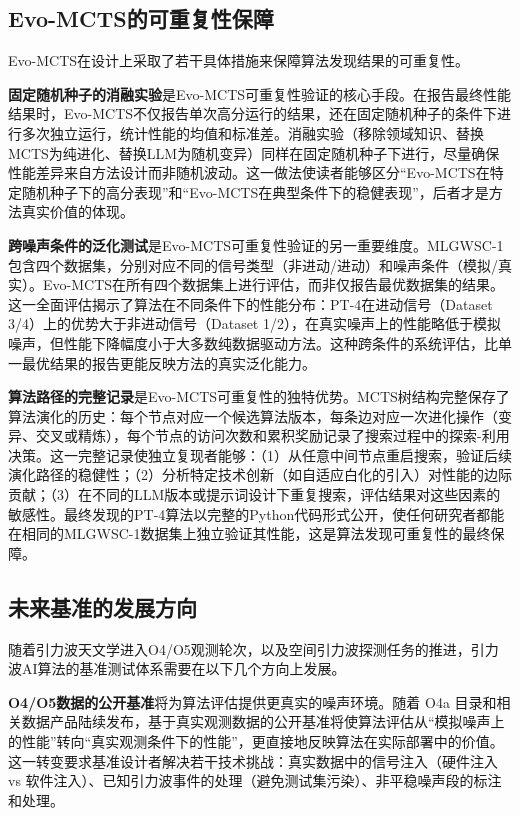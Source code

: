 \subsection*{Evo-MCTS的可重复性保障}

Evo-MCTS在设计上采取了若干具体措施来保障算法发现结果的可重复性。

\textbf{固定随机种子的消融实验}是Evo-MCTS可重复性验证的核心手段。在报告最终性能结果时，Evo-MCTS不仅报告单次高分运行的结果，还在固定随机种子的条件下进行多次独立运行，统计性能的均值和标准差。消融实验（移除领域知识、替换MCTS为纯进化、替换LLM为随机变异）同样在固定随机种子下进行，尽量确保性能差异来自方法设计而非随机波动。这一做法使读者能够区分“Evo-MCTS在特定随机种子下的高分表现”和“Evo-MCTS在典型条件下的稳健表现”，后者才是方法真实价值的体现。

\textbf{跨噪声条件的泛化测试}是Evo-MCTS可重复性验证的另一重要维度。MLGWSC-1包含四个数据集，分别对应不同的信号类型（非进动/进动）和噪声条件（模拟/真实）。Evo-MCTS在所有四个数据集上进行评估，而非仅报告最优数据集的结果。这一全面评估揭示了算法在不同条件下的性能分布：PT-4在进动信号（Dataset 3/4）上的优势大于非进动信号（Dataset 1/2），在真实噪声上的性能略低于模拟噪声，但性能下降幅度小于大多数纯数据驱动方法。这种跨条件的系统评估，比单一最优结果的报告更能反映方法的真实泛化能力。

\textbf{算法路径的完整记录}是Evo-MCTS可重复性的独特优势。MCTS树结构完整保存了算法演化的历史：每个节点对应一个候选算法版本，每条边对应一次进化操作（变异、交叉或精炼），每个节点的访问次数和累积奖励记录了搜索过程中的探索-利用决策。这一完整记录使独立复现者能够：（1）从任意中间节点重启搜索，验证后续演化路径的稳健性；（2）分析特定技术创新（如自适应白化的引入）对性能的边际贡献；（3）在不同的LLM版本或提示词设计下重复搜索，评估结果对这些因素的敏感性。最终发现的PT-4算法以完整的Python代码形式公开，使任何研究者都能在相同的MLGWSC-1数据集上独立验证其性能，这是算法发现可重复性的最终保障。

\subsection*{未来基准的发展方向}

随着引力波天文学进入O4/O5观测轮次，以及空间引力波探测任务的推进，引力波AI算法的基准测试体系需要在以下几个方向上发展。

\textbf{O4/O5数据的公开基准}将为算法评估提供更真实的噪声环境。随着 O4a 目录和相关数据产品陆续发布，基于真实观测数据的公开基准将使算法评估从“模拟噪声上的性能”转向“真实观测条件下的性能”，更直接地反映算法在实际部署中的价值。这一转变要求基准设计者解决若干技术挑战：真实数据中的信号注入（硬件注入 vs 软件注入）、已知引力波事件的处理（避免测试集污染）、非平稳噪声段的标注和处理。

